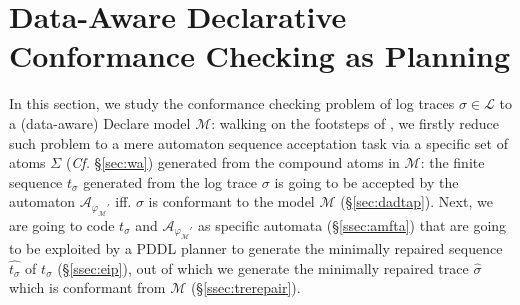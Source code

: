 \section{Data-Aware Declarative Conformance Checking as Planning}\label{sec:dccap}
In this section, we study the conformance checking problem of log traces $\sigma\in\mathcal{L}$ to a (data-aware) Declare model $\mathcal{M}$: walking on the footsteps of \cite{XuLZ17a,MaggiMCA18}, we firstly reduce such problem to a mere automaton sequence acceptation task via a specific set of atoms $\Sigma$ (\textit{Cf.} \S\ref{sec:wa}) generated from the compound atoms in  $\mathcal{M}$: the finite sequence $t_\sigma$ generated from the log trace $\sigma$ is going to be accepted by the automaton $\mathcal{A}_{\varphi_{\mathcal{M}}'}$ iff. $\sigma$ is conformant to the model $\mathcal{M}$ (\S\ref{sec:dadtap}). Next, we are going to code $t_\sigma$ and $\mathcal{A}_{\varphi_{\mathcal{M}}'}$ as specific automata (\S\ref{ssec:amfta}) that are going to be exploited by a PDDL planner to generate the minimally repaired sequence $\hat{t_\sigma}$ of $t_\sigma$ (\S\ref{ssec:eip}), out of which we generate the minimally repaired trace $\hat{\sigma}$ which is conformant from $\mathcal{M}$ (\S\ref{ssec:trerepair}).






